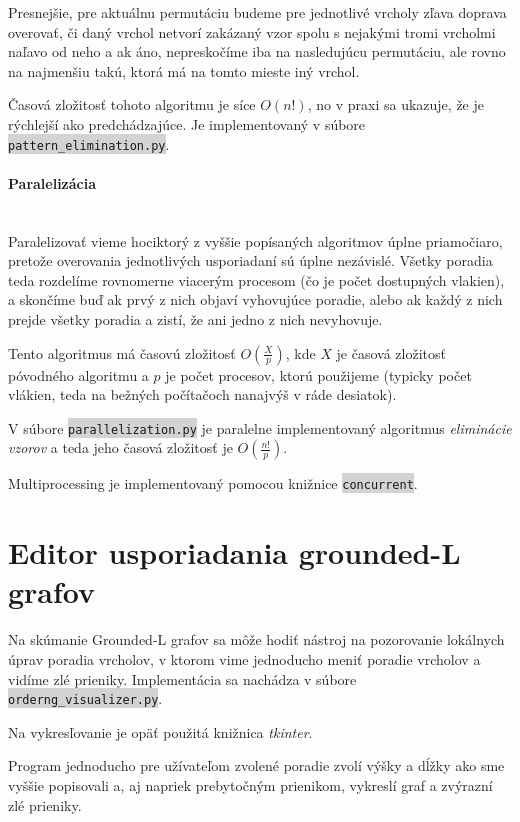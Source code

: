\documentclass{article}
\newcommand{\code}[1]{\colorbox{lightgray}{\lstinline{#1}}}
\begin{document}
Presnejšie, pre aktuálnu permutáciu budeme pre jednotlivé vrcholy zľava doprava overovať, či daný vrchol netvorí zakázaný vzor spolu s nejakými tromi vrcholmi naľavo od neho a ak áno, nepreskočíme iba na nasledujúcu permutáciu, ale rovno na najmenšiu takú, ktorá má na tomto mieste iný vrchol.

Časová zložitosť tohoto algoritmu je síce $O(n!)$, no v praxi sa ukazuje, že je rýchlejší ako predchádzajúce. Je implementovaný v súbore \code{pattern_elimination.py}.

\paragraph{Paralelizácia}\mbox{} \\

Paralelizovať vieme hociktorý z vyššie popísaných algoritmov úplne priamočiaro, pretože overovania jednotlivých usporiadaní sú úplne nezávislé. Všetky poradia teda rozdelíme rovnomerne viacerým procesom (čo je počet dostupných vlakien), a skončíme buď ak prvý z nich objaví vyhovujúce poradie, alebo ak každý z nich prejde všetky poradia a zistí, že ani jedno z nich nevyhovuje.

Tento algoritmus má časovú zložitosť $O(\frac{X}{p})$, kde $X$ je časová zložitosť póvodného algoritmu a $p$ je počet procesov, ktorú použijeme (typicky počet vlákien, teda na bežných počítačoch nanajvýš v ráde desiatok).

V súbore \code{parallelization.py} je paralelne implementovaný algoritmus \textit{eliminácie vzorov} a teda jeho časová zložitosť je $O(\frac{n!}{p})$.

Multiprocessing je implementovaný pomocou knižnice \code{concurrent}.

\section{Editor usporiadania grounded-L grafov}

Na skúmanie Grounded-L grafov sa môže hodiť nástroj na pozorovanie lokálnych úprav poradia vrcholov, v ktorom vime jednoducho meniť poradie vrcholov a vidíme zlé prieniky.
Implementácia sa nachádza v súbore \code{orderng_visualizer.py}.

Na vykresľovanie je opäť použitá knižnica \textit{tkinter}.

Program jednoducho pre užívateľom zvolené poradie zvolí výšky a dĺžky ako sme vyššie popisovali a, aj napriek prebytočným prienikom, vykreslí graf a zvýrazní zlé prieniky.
\end{document}
